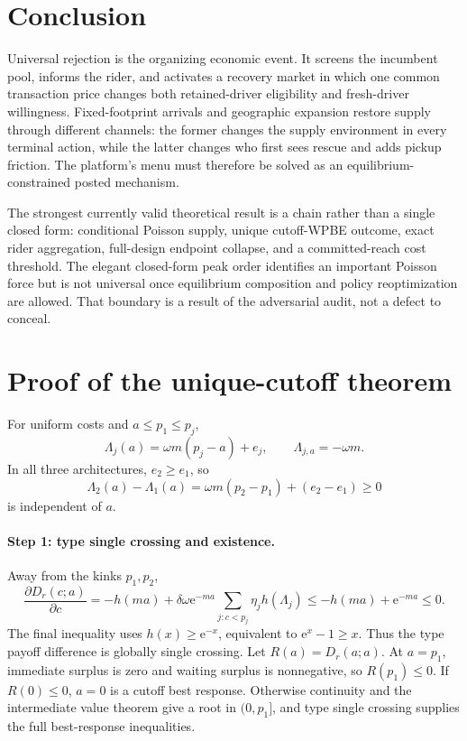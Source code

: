 \documentclass[11pt]{article}
\theoremstyle{definition}
\theoremstyle{remark}
\newcommand{\e}{\mathrm e}
\begin{document}
\section{Conclusion}

Universal rejection is the organizing economic event.  It screens the
incumbent pool, informs the rider, and activates a recovery market in which
one common transaction price changes both retained-driver eligibility and
fresh-driver willingness.  Fixed-footprint arrivals and geographic expansion
restore supply through different channels: the former changes the supply
environment in every terminal action, while the latter changes who first sees
rescue and adds pickup friction.  The platform's menu must therefore be solved
as an equilibrium-constrained posted mechanism.

The strongest currently valid theoretical result is a chain rather than a
single closed form: conditional Poisson supply, unique cutoff-WPBE outcome,
exact rider aggregation, full-design endpoint collapse, and a committed-reach
cost threshold.  The elegant closed-form peak order identifies an important
Poisson force but is not universal once equilibrium composition and policy
reoptimization are allowed.  That boundary is a result of the adversarial
audit, not a defect to conceal.

\appendix

\section{Proof of the unique-cutoff theorem}
\label{app:unique}

For uniform costs and $a\le p_1\le p_j$,
\[
\Lambda_j(a)=\omega m(p_j-a)+e_j,
\qquad \Lambda_{j,a}=-\omega m.
\]
In all three architectures, $e_2\ge e_1$, so
\[
\Lambda_2(a)-\Lambda_1(a)
=\omega m(p_2-p_1)+(e_2-e_1)\ge0
\]
is independent of $a$.

\paragraph{Step 1: type single crossing and existence.}
Away from the kinks $p_1,p_2$,
\[
\frac{\partial D_r(c;a)}{\partial c}
=-h(ma)+\delta\omega\e^{-ma}
\sum_{j:c<p_j}\eta_jh(\Lambda_j)
\le-h(ma)+\e^{-ma}\le0.
\]
The final inequality uses $h(x)\ge\e^{-x}$, equivalent to
$\e^x-1\ge x$.  Thus the type payoff difference is globally single crossing.
Let $R(a)=D_r(a;a)$.  At $a=p_1$, immediate surplus is zero and waiting
surplus is nonnegative, so $R(p_1)\le0$.  If $R(0)\le0$, $a=0$ is a cutoff
best response.  Otherwise continuity and the intermediate value theorem give
a root in $(0,p_1]$, and type single crossing supplies the full best-response
inequalities.
\end{document}
